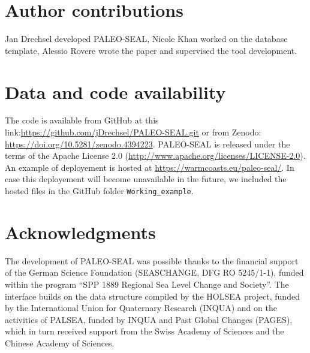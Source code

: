 \documentclass[a4paper,fleqn]{cas-dc}
\begin{document}
\section{Author contributions}
Jan Drechsel developed PALEO-SEAL, Nicole Khan worked on the database template, Alessio Rovere wrote the paper and supervised the tool development. 

\section{Data and code availability}
The code is available from GitHub at this link:\url{https://github.com/jDrechsel/PALEO-SEAL.git} or from Zenodo: \url{https://doi.org/10.5281/zenodo.4394223}. PALEO-SEAL is released under the terms of the Apache License 2.0 (\url{http://www.apache.org/licenses/LICENSE-2.0}). An example of deployement is hosted at \url{https://warmcoasts.eu/paleo-seal/}. In case this deployement will become unavailable in the future, we included the hosted files in the GitHub folder \texttt{Working\_example}. 

\section{Acknowledgments}
The development of PALEO-SEAL was possible thanks to the financial support of the German Science Foundation (SEASCHANGE, DFG RO 5245/1-1), funded within the program 
``SPP 1889 Regional Sea Level Change and Society''. The interface builds on the data structure compiled by the HOLSEA project, funded by the International Union for Quaternary Research (INQUA) and on the activities of PALSEA, funded by INQUA and Past Global Changes (PAGES), which in turn received support from the Swiss Academy of Sciences and the Chinese Academy of Sciences.

%



\end{document}
